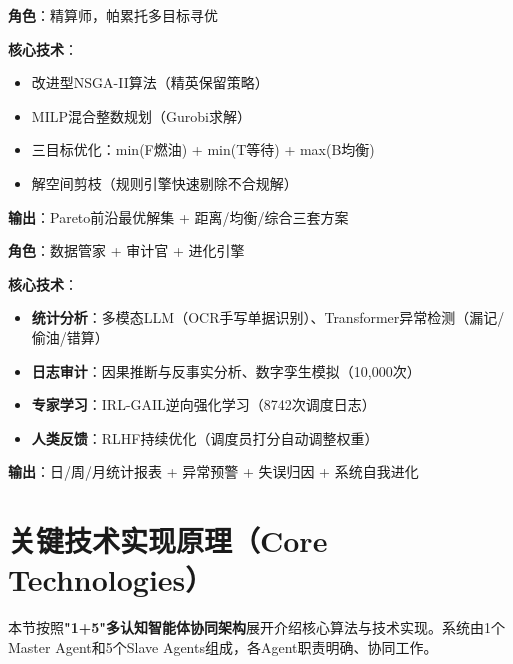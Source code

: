 \documentclass[12pt,a4paper]{article}
\begin{document}
\vspace{0.5cm}

\begin{tcolorbox}[colback=green!5!white,colframe=green!75!black,title=\textbf{Slave Agent 4：运筹规划智能体（Optimization Agent）}]
\textbf{角色}：精算师，帕累托多目标寻优

\textbf{核心技术}：
\begin{itemize}
    \item 改进型NSGA-II算法（精英保留策略）
    \item MILP混合整数规划（Gurobi求解）
    \item 三目标优化：min(F燃油) + min(T等待) + max(B均衡)
    \item 解空间剪枝（规则引擎快速剔除不合规解）
\end{itemize}

\textbf{输出}：Pareto前沿最优解集 + 距离/均衡/综合三套方案
\end{tcolorbox}

\vspace{0.5cm}

\begin{tcolorbox}[colback=yellow!5!white,colframe=yellow!75!black,title=\textbf{Slave Agent 5：分析与学习智能体（Analysis \& Learning Agent）}]
\textbf{角色}：数据管家 + 审计官 + 进化引擎

\textbf{核心技术}：
\begin{itemize}
    \item \textbf{统计分析}：多模态LLM（OCR手写单据识别）、Transformer异常检测（漏记/偷油/错算）
    \item \textbf{日志审计}：因果推断与反事实分析、数字孪生模拟（10,000次）
    \item \textbf{专家学习}：IRL-GAIL逆向强化学习（8742次调度日志）
    \item \textbf{人类反馈}：RLHF持续优化（调度员打分自动调整权重）
\end{itemize}

\textbf{输出}：日/周/月统计报表 + 异常预警 + 失误归因 + 系统自我进化
\end{tcolorbox}

\section{关键技术实现原理（Core Technologies）}

本节按照\textbf{"1+5"多认知智能体协同架构}展开介绍核心算法与技术实现。系统由1个Master Agent和5个Slave Agents组成，各Agent职责明确、协同工作。
\end{document}
